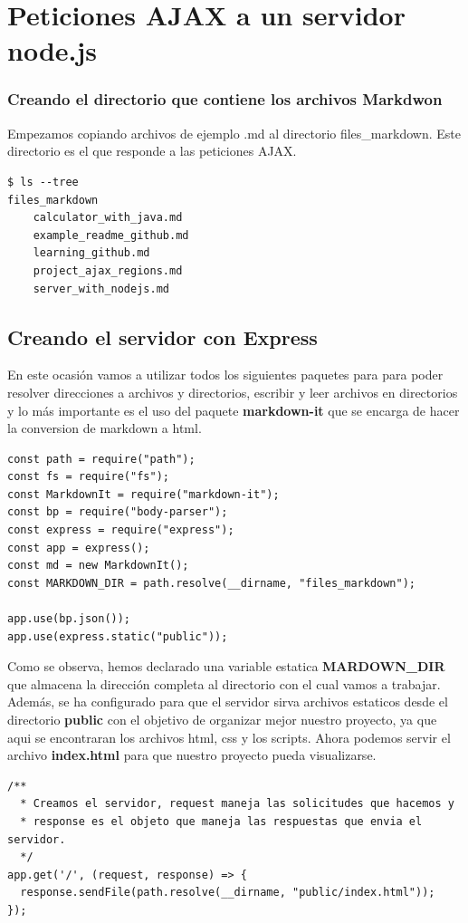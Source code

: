 \section{Peticiones AJAX a un servidor node.js}

\subsubsection{Creando el directorio que contiene los archivos Markdwon}
Empezamos copiando archivos de ejemplo .md al directorio files\_markdown. Este directorio es el que responde a las peticiones AJAX.

\begin{verbatim}
$ ls --tree
files_markdown
	calculator_with_java.md
	example_readme_github.md
	learning_github.md
	project_ajax_regions.md
	server_with_nodejs.md
\end{verbatim}

\subsection{Creando el servidor con Express}
En este ocasión vamos a utilizar todos los siguientes paquetes para para poder resolver direcciones a archivos y directorios, escribir y leer archivos en directorios y lo más importante es el uso del paquete \textbf{markdown-it} que se encarga de hacer la conversion de markdown a html.

\begin{verbatim}
const path = require("path");
const fs = require("fs");
const MarkdownIt = require("markdown-it");
const bp = require("body-parser");
const express = require("express");
const app = express();
const md = new MarkdownIt();
const MARKDOWN_DIR = path.resolve(__dirname, "files_markdown");

app.use(bp.json());
app.use(express.static("public"));
\end{verbatim}

Como se observa, hemos declarado una variable estatica \textbf{MARDOWN\_DIR} que almacena la dirección completa al directorio con el cual vamos a trabajar. Además, se ha configurado para que el servidor sirva archivos estaticos desde el directorio \textbf{public} con el objetivo de organizar mejor nuestro proyecto, ya que aqui se encontraran los archivos html, css y los scripts.
\singlespacing
Ahora podemos servir el archivo \textbf{index.html} para que nuestro proyecto pueda visualizarse.

\begin{verbatim}
/** 
  * Creamos el servidor, request maneja las solicitudes que hacemos y 
  * response es el objeto que maneja las respuestas que envia el servidor.
  */ 
app.get('/', (request, response) => {
  response.sendFile(path.resolve(__dirname, "public/index.html"));
});
\end{verbatim}

